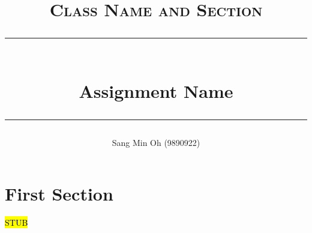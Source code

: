 \documentclass[paper=a4, fontsize=10pt]{scrartcl}
\title{
		\vspace{-1in} 	
		\usefont{OT1}{bch}{b}{n}
		\normalfont \large \textsc{Class Name and Section} \\ [10pt]
		\rule{\linewidth}{2pt} \\ [0.4cm]
		\Huge Assignment Name \\
		\rule{\linewidth}{2pt}
}
\author{
		\normalfont 
		\large Sang Min Oh (9890922) \\ [-3pt]		 			%
}
\date{}
\begin{document}
\maketitle

\vspace{-0.5in}%
\section{First Section}
\hl{STUB}




\end{document}
